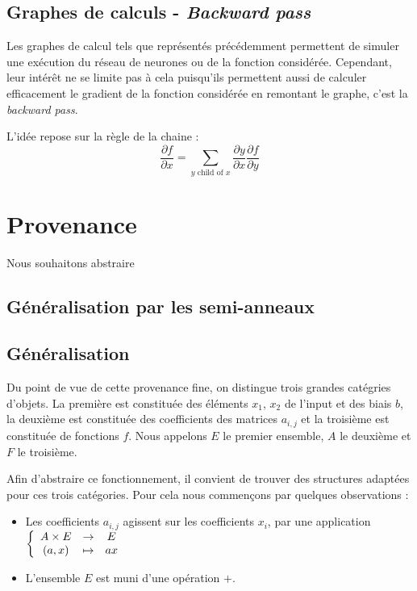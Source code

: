 \documentclass[11pt,a4paper]{article}
\begin{document}
\subsection{Graphes de calculs - \textit{Backward pass}}

Les graphes de calcul tels que représentés précédemment permettent de simuler une exécution du réseau de neurones ou de la fonction considérée. Cependant, leur intérêt ne se limite pas à cela puisqu'ils permettent aussi de calculer efficacement le gradient de la fonction considérée en remontant le graphe, c'est la \textit{backward pass}.

L'idée repose sur la règle de la chaine : 
	$$ \frac{\partial f}{\partial x} = \underset{y \text{ child of }x}{\sum} \frac{\partial y}{\partial x} \frac{\partial f}{\partial y} $$

\section{Provenance}

Nous souhaitons abstraire

	\subsection{Généralisation par les semi-anneaux}

	\subsection{Généralisation}

	Du point de vue de cette provenance fine, on distingue trois grandes catégries d'objets. La première est constituée des éléments $x_1$, $x_2$ de l'input et des biais $b$, la deuxième est constituée des coefficients des matrices $a_{i,j}$ et la troisième est constituée de fonctions $f$. Nous appelons $E$ le premier ensemble, $A$ le deuxième et $F$ le troisième.
	
	Afin d'abstraire ce fonctionnement, il convient de trouver des structures adaptées pour ces trois catégories. Pour cela nous commençons par quelques observations :
	
	\begin{itemize}
	
		\item Les coefficients $a_{i,j}$ agissent sur les coefficients $x_{i}$, par une application 
		$\left\lbrace \begin{array}{c c c}
		 A \times E & \to & E \\
		 (a,x) & \mapsto & ax
\end{array}
\right.$
		
		\item L'ensemble $E$ est muni d'une opération $+$.
	
	\end{itemize}
\end{document}
